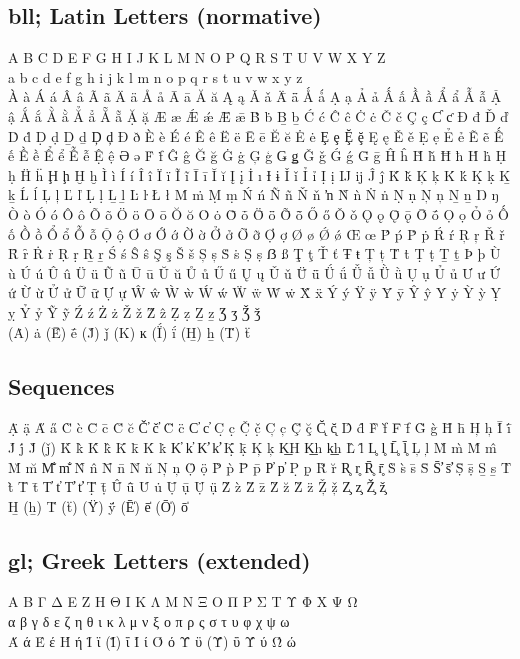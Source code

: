 \subsection{bll; Latin Letters (normative)}

A B C D E F G H I J K L M N O P Q R S T U V W X Y Z\\
a b c d e f g h i j k l m n o p q r s t u v w x y z\\
À à Á á Â â Ã ã Ä ä Å å Ā ā Ă ă Ą ą Ǎ ǎ Ǟ ǟ Ǻ ǻ Ạ ạ Ả ả Ấ ấ Ầ ầ Ẩ ẩ Ẫ ẫ Ậ ậ Ắ ắ Ằ ằ Ẳ ẳ Ẵ ẵ Ặ ặ
Æ æ Ǽ ǽ Ǣ ǣ
Ḃ ḃ Ḇ ḇ
Ć ć Ĉ ĉ Ċ ċ Č č Ç ç Ƈ ƈ
Đ đ Ď ď Ḋ ḋ Ḍ ḍ Ḏ ḏ Ḑ ḑ Ð ð
È è É é Ê ê Ë ë Ē ē Ĕ ĕ Ė ė Ȩ ȩ Ḝ ḝ Ę ę Ě ě Ẹ ẹ Ẻ ẻ Ẽ ẽ Ế ế Ề ề Ể ể Ễ ễ Ệ ệ
Ə ə
Ḟ ḟ
Ĝ ĝ Ğ ğ Ġ ġ Ģ ģ Ǥ ǥ Ǧ ǧ Ǵ ǵ Ḡ ḡ
Ĥ ĥ Ȟ ȟ Ħ ħ Ḣ ḣ Ḥ ḥ Ḧ ḧ Ḩ ḩ Ḫ ḫ
Ì ì Í í Î î Ï ï Ĩ ĩ Ī ī Ĭ ĭ Į į İ ı Ɨ ɨ Ǐ ǐ Ỉ ỉ Ị ị
Ĳ ĳ
Ĵ ĵ
Ǩ ǩ Ķ ķ Ḱ ḱ Ḳ ḳ Ḵ ḵ
Ĺ ĺ Ļ ļ Ľ ľ Ḷ ḷ Ḻ ḻ Ŀ ŀ Ł ł
Ṁ ṁ Ṃ ṃ
Ń ń Ñ ñ Ň ň ŉ Ǹ ǹ Ṅ ṅ Ṇ ṇ Ņ ņ Ṉ ṉ Ŋ ŋ
Ò ò Ó ó Ô ô Õ õ Ö ö Ō ō Ŏ ŏ Ȯ ȯ Ȱ ȱ Ȫ ȫ Ȭ ȭ Ő ő Ǒ ǒ Ǫ ǫ Ǭ ǭ Ṓ ṓ Ọ ọ Ỏ ỏ Ố ố Ồ ồ Ổ ổ Ỗ ỗ Ộ ộ Ơ ơ Ớ ớ Ờ ờ Ở ở Ỡ ỡ Ợ ợ
Ø ø Ǿ ǿ
Œ œ
Ṕ ṕ Ṗ ṗ
Ŕ ŕ Ŗ ŗ Ř ř Ȓ ȓ Ṙ ṙ Ṛ ṛ Ṟ ṟ
Ś ś Ŝ ŝ Ş ş Š š Ș ș Ṡ ṡ Ṣ ṣ
ẞ ß
Ţ ţ Ť ť Ŧ ŧ Ț ț Ṫ ṫ Ṭ ṭ Ṯ ṯ
Þ þ
Ù ù Ú ú Û û Ü ü Ũ ũ Ū ū Ŭ ŭ Ů ů Ű ű Ų ų Ǔ ǔ Ǖ ǖ Ǘ ǘ Ǚ ǚ Ǜ ǜ Ụ ụ Ủ ủ Ư ư Ứ ứ Ừ ừ Ử ử Ữ ữ Ự ự
Ŵ ŵ Ẁ ẁ Ẃ ẃ Ẅ ẅ Ẇ ẇ
Ẍ ẍ
Ý ý Ÿ ÿ Ȳ ȳ Ŷ ŷ Ẏ ẏ Ỳ ỳ Ỵ ỵ Ỷ ỷ Ỹ ỹ
Ź ź Ż ż Ž ž Ẑ ẑ Ẓ ẓ Ẕ ẕ
Ʒ ʒ Ǯ ǯ\\
(Ȧ) ȧ (Ḗ) ḗ (J̌) ǰ (K) ĸ (Ḯ) ḯ (H̱) ẖ (T̈) ẗ 


\subsection{Sequences}

Ạ̈ ạ̈ A̋ a̋ C̀ c̀ C̄ c̄ C̆ c̆ Č̕ č̕ C̈ c̈ C̕ c̕ C̣ c̣ Č̣ č̣ C̦ c̦ Ç̆ ç̆ C̨̆ c̨̆ D̂ d̂ F̀ f̀ F̄ f̄ G̀ g̀ H̄ h̄ H̦ h̦ Ī́ ī́ J́ j́ J̌ (ǰ) K̀ k̀ K̂ k̂ K̄ k̄ K̇ k̇ K̕ k̕ K̛ k̛ Ḳ̄ ḳ̄ K̦ k̦ K͟H K͟h k͟h L̂ l̂ L̥ l̥ L̥̄ l̥̄ L̦ l̦ M̀ m̀ M̂ m̂ M̆ m̆ M̐ m̐ N̂ n̂ N̄ n̄ N̆ n̆ N̦ n̦ Ọ̈ ọ̈ P̀ p̀ P̄ p̄ P̕ p̕ P̣ p̣ R̆ r̆ R̥ r̥ R̥̄ r̥̄ S̀ s̀ s̄ S̄ S̛̄ s̛̄ Ṣ̄ ṣ̄ S̱ s̱ T̀ t̀ T̄ t̄ T̕ t̕ T̛ t̛ Ṭ̄ ṭ̄ Û̄ û̄ U̇ u̇ Ụ̄ ụ̄ Ụ̈ ụ̈ Z̀ z̀ Z̄ z̄ Z̆ z̆ Z̈ z̈ Ž̦ ž̦ Z̧ z̧ Ž̧ ž̧\\
H̱ (ẖ) T̈ (ẗ) (Ÿ́) ÿ́ (Ē̍) ē̍ (Ō̍) ō̍ 

\subsection{gl; Greek Letters (extended)}

Α Β Γ Δ Ε Ζ Η Θ Ι Κ Λ Μ Ν Ξ Ο Π Ρ Σ Τ Υ Φ Χ Ψ Ω\\
α β γ δ ε ζ η θ ι κ λ μ ν ξ ο π ρ ς σ τ υ φ χ ψ ω\\
Ά ά 
Έ έ 
Ή ή 
Ϊ ϊ (Ϊ́) ΐ
Ί ί 
Ό ό 
Ϋ ϋ (Ϋ́) ΰ
Ύ ύ 
Ώ ώ 


